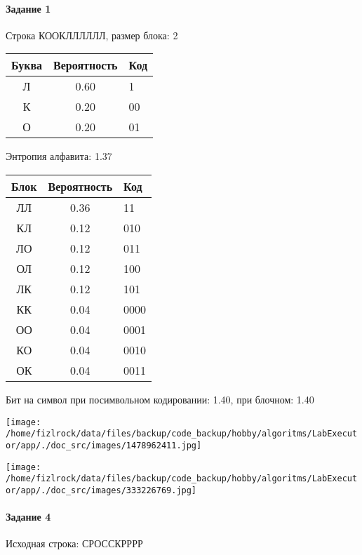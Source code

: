\documentclass[a4paper, 12pt]{article}
\begin{document}
\paragraph{Задание 1}

Строка КООКЛЛЛЛЛЛ, размер блока: 2
\begin{center}
 \begin{tabular}{ |c|c|l| } 
  \hline
     Буква & Вероятность & Код\\ \hline
Л & 0.60 & 1\\\hline
К & 0.20 & 00\\\hline
О & 0.20 & 01
\\ \hline \end{tabular}
\end{center}
Энтропия алфавита: 1.37
\begin{center}
 \begin{tabular}{ |c|c|l| } 
  \hline
     Блок & Вероятность & Код\\ \hline
ЛЛ & 0.36 & 11\\\hline
КЛ & 0.12 & 010\\\hline
ЛО & 0.12 & 011\\\hline
ОЛ & 0.12 & 100\\\hline
ЛК & 0.12 & 101\\\hline
КК & 0.04 & 0000\\\hline
ОО & 0.04 & 0001\\\hline
КО & 0.04 & 0010\\\hline
ОК & 0.04 & 0011
\\ \hline \end{tabular}
\end{center}
Бит на символ при посимвольном кодировании: 1.40, при блочном: 1.40

\texttt{[image: /home/fizlrock/data/files/backup/code\_backup/hobby/algoritms/LabExecutor/app/./doc\_src/images/1478962411.jpg]}

\texttt{[image: /home/fizlrock/data/files/backup/code\_backup/hobby/algoritms/LabExecutor/app/./doc\_src/images/333226769.jpg]}
\paragraph{Задание 4}


Исходная строка: СРОССКРРРР
\end{document}
